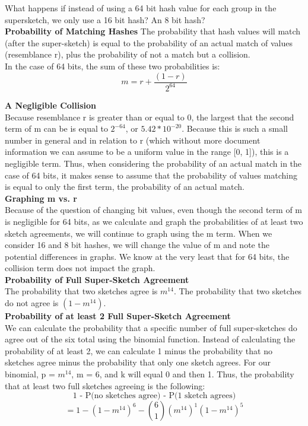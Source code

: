 \documentclass[11pt, solution, letterpaper]{format}
\begin{document}
What happens if instead of using a 64 bit hash value for each group in the supersketch, we only use a 16 bit
hash? An 8 bit hash?\\

\textbf{Probability of Matching Hashes}
The probability that hash values will match (after the super-sketch) is equal to the probability of an actual match of values (resemblance r), plus the probability of not a match but a collision.\\

In the case of 64 bits, the sum of these two probabilities is:\\
$$m = r + \frac{(1 - r)}{2^{64}}$$

\textbf{A Negligible Collision}\\
Because resemblance r is greater than or equal to 0, the largest that the second term of m can be is equal to $2^{-64}$, or $5.42 * 10^{-20}$.  Because this is such a small number in general and in relation to r (which without more document information we can assume to be a uniform value in the range [0, 1]), this is a negligible  term. Thus, when considering the probability of an actual match in the case of 64 bits, it makes sense to assume that the probability of values matching is equal to only the first term, the probability of an actual match. \\

\textbf{Graphing m vs. r}\\
Because of the question of changing bit values, even though the second term of m is negligible for 64 bits, as we calculate and graph the probabilities of at least two sketch agreements, we will continue to graph using the m term. When we consider 16 and 8 bit hashes, we will change the value of m and note the potential differences in graphs. We know at the very least that for 64 bits, the collision term does not impact the graph.\\

\textbf{Probability of Full Super-Sketch Agreement}\\
The probability that two sketches agree is $m^{14}$. The probability that two sketches do not agree is $(1 - m^{14})$.\\


\textbf{Probability of at least 2 Full Super-Sketch Agreement}\\
We can calculate the probability that a specific number of full super-sketches do agree out of the six total using the binomial function. Instead of calculating the probability of at least 2, we can calculate 1 minus the probability that no sketches agree minus the probability that only one sketch agrees. For our binomial, p = $m^{14}$, m = 6, and k will equal 0 and then 1.  Thus, the probability that at least two full sketches agreeing is the following:\\
$$\text{1 - P(no sketches agree) - P(1 sketch agrees)}$$
$$ = 1 - (1 - m^{14})^6 - {6 \choose 1}(m^{14})^1(1 - m^{14})^5 $$
\end{document}
